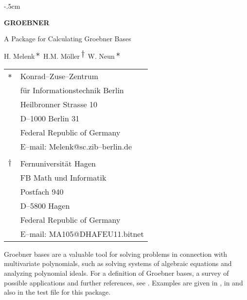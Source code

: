 \hoffset -.5cm
\setlength{\parindent}{.5cm}
\setlength{\parskip}{2mm}
\addtolength{\textheight}{1cm}
\newcommand{\mexp}{\mbox{exp}}
\newcommand{\lstar}{\mbox {\large $*$}}
\newcommand{\ldag}{\mbox {\large $\dagger$}}
\newtheorem{Theorem}{Theorem}

\pagestyle{plain}
\vspace*{1cm}
\begin{center}
{\LARGE {\bf GROEBNER}} \vspace*{.5cm}\par
{\LARGE {A Package for Calculating Groebner Bases}}
\vspace*{.5cm}\par
{\large H. Melenk}$\,^{\lstar}$ \hspace*{1cm} {\large H.M. M\"oller}$
\,^{\ldag}$\hspace*{1cm} {\large W. Neun}$\,^{\lstar}$
\end{center}
\begin{center}
\begin{tabular}{ll}
{$\lstar$} & {\large  Konrad--Zuse--Zentrum} \\
& {\large f\"ur Informationstechnik Berlin} \\
& {\large Heilbronner Strasse 10} \\
& {\large D--1000 Berlin 31} \\
& {\large Federal Republic of Germany} \\
& {\large E--mail:  Melenk@sc.zib--berlin.de} \\ \\
{$\ldag$} & {\large Fernuniversit\"at Hagen} \\
& {\large FB Math und Informatik} \\
& {\large Postfach 940} \\
& {\large D--5800 Hagen} \\
& {\large Federal Republic of Germany}\\
& {\large E--mail: MA105@DHAFEU11.bitnet}

\end{tabular}
\end{center}
\vspace*{.5cm}\par
Groebner bases are a valuable tool for solving problems in
connection with multivariate polynomials, such as solving systems of
algebraic equations and analyzing polynomial ideals. For a definition
of Groebner bases, a survey of possible applications and further
references, see \cite{BUCH85}. Examples are given in \cite{BOGEK86},
in \cite{BUCH88} and also in the test file for this package.

